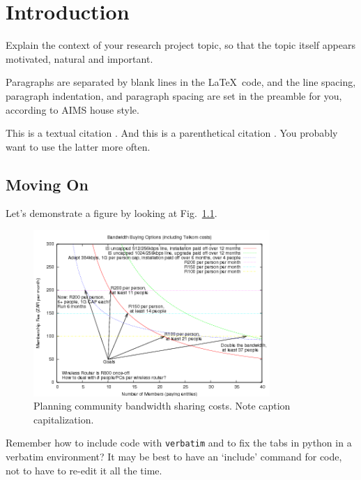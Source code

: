 \chapter{Introduction}

Explain the context of your research project topic, so that the
topic itself appears motivated, natural and important.

Paragraphs are separated by blank lines in the \LaTeX\ code, 
and the line spacing, paragraph indentation,
and paragraph spacing are set in the preamble for you, 
according to AIMS house style.

This is a textual citation \citet{shannon44}. And this is a parenthetical citation \citep{shannon44}. You probably want to use the latter more often.

\section{Moving On}
Let's demonstrate a figure by looking at Fig.~\ref{bandwidth}. 

\begin{figure}[!h]
\centering 
\includegraphics[width=0.8\textwidth]{Images/bandwidth-colour.png}
\caption{Planning community bandwidth sharing costs. 
  Note caption capitalization.}
\label{bandwidth} 
\end{figure}

Remember how to include code with {\tt verbatim} 
and to fix the tabs in {\sf python} in a verbatim environment? 
It may be best to have an `include' command for code, 
not to have to re-edit it all the time.


